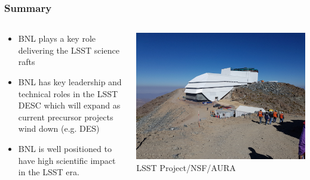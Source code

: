 \documentclass[aspectratio=169]{beamer}
\begin{document}
\frame
{

    \frametitle{Summary}


    \begin{columns}
        \begin{column}{0.4\textwidth}
            \begin{itemize}

                \item BNL plays a key role delivering the LSST science rafts

                \item BNL has key leadership and technical roles in the LSST
                    DESC which will expand as current precursor projects
                    wind down (e.g. DES)

                \item BNL is well positioned to have high scientific impact
                    in the LSST era.

            \end{itemize}

        \end{column}
        \begin{column}{0.6\textwidth}
            \centering
                \includegraphics[width=\linewidth]{20180207_101422_scaled.jpg}
                \newline
                {\tiny LSST Project/NSF/AURA}
        \end{column}

    \end{columns}

}
\end{document}
